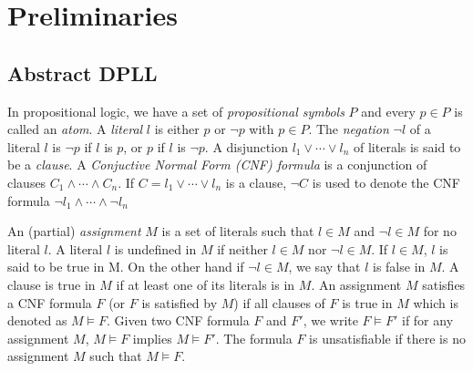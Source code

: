 \chapter{Preliminaries} \label{chap:preliminaries}
\section{Abstract DPLL}
In propositional logic, we have a set of \emph{propositional symbols} $P$ and every $p \in P$ is called an \emph{atom}. A \emph{literal} $l$ is either $p$ or $\neg p$ with $p \in P$. The \emph{negation} $\neg l$ of a literal $l$ is $\neg p$ if $l$ is $p$, or $p$ if $l$ is $\neg p$. A disjunction $l_1 \vee \cdots \vee l_n$ of literals is said to be a \emph{clause}. A \emph{Conjuctive Normal Form (CNF) formula} is a conjunction of clauses $C_1 \wedge \cdots \wedge C_n$. If $C = l_1 \vee \cdots \vee l_n$ is a clause, $\neg C$ is used to denote the CNF formula $\neg l_1 \wedge \cdots \wedge \neg l_n$

An (partial) \emph{assignment} $M$ is a set of literals such that $l \in M$ and $\neg l \in M$ for no literal $l$. A literal $l$ is undefined in $M$ if neither $l \in M$ nor $\neg l \in M$. If $l \in M$, $l$ is said to be true in M. On the other hand if $\neg l \in M$, we say that $l$ is false in $M$. A clause is true in $M$ if at least one of its literals is in $M$. An assignment $M$ satisfies a CNF formula $F$ (or $F$ is satisfied by $M$) if all clauses of $F$ is true in $M$ which is denoted as $M \models F$. Given two CNF formula $F$ and $F'$, we write $F \models F'$ if for any assignment $M$, $M \models F$ implies $M \models F'$. The formula $F$ is unsatisfiable if there is no assignment $M$ such that $M \models F$.

